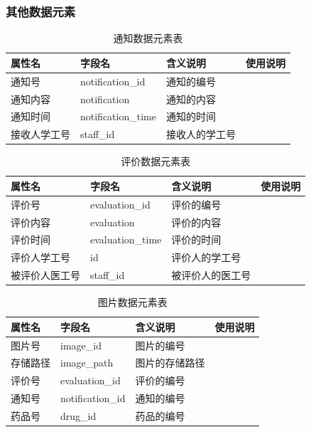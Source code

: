 \documentclass{article}
\begin{document}
\subsubsection{其他数据元素}

\begin{table}[H]
    \centering
    \begin{tabularx}{\textwidth}{|p{2.2cm}|p{3.3cm}|p{4.7cm}|p{5cm}|}
    \toprule
    \textbf{属性名} & \textbf{字段名} & \textbf{含义说明} & \textbf{使用说明} \\ \midrule
    通知号 & notification\_id & 通知的编号 &  \\ \midrule
    通知内容 & notification & 通知的内容 &  \\ \midrule
    通知时间 & notification\_time & 通知的时间 &  \\ \midrule
    接收人学工号 & staff\_id & 接收人的学工号 &  \\ \bottomrule
    \end{tabularx}
    \caption{通知数据元素表}
    \label{tab:notification_elements}
\end{table}

\begin{table}[H]
    \centering
    \begin{tabularx}{\textwidth}{|p{2.2cm}|p{3.3cm}|p{4.7cm}|p{5cm}|}
    \toprule
    \textbf{属性名} & \textbf{字段名} & \textbf{含义说明} & \textbf{使用说明} \\ \midrule
    评价号 & evaluation\_id & 评价的编号 &  \\ \midrule
    评价内容 & evaluation & 评价的内容 &  \\ \midrule
    评价时间 & evaluation\_time & 评价的时间 &  \\ \midrule
    评价人学工号 & id & 评价人的学工号 &  \\ \midrule
    被评价人医工号 & staff\_id & 被评价人的医工号 &  \\ \bottomrule
    \end{tabularx}
    \caption{评价数据元素表}
    \label{tab:evaluation_elements}
\end{table}

\begin{table}[H]
    \centering
    \begin{tabularx}{\textwidth}{|p{2.2cm}|p{3.3cm}|p{4.7cm}|p{5cm}|}
    \toprule
    \textbf{属性名} & \textbf{字段名} & \textbf{含义说明} & \textbf{使用说明} \\ \midrule
    图片号 & image\_id & 图片的编号 &  \\ \midrule
    存储路径 & image\_path & 图片的存储路径 &  \\ \midrule
    评价号 & evaluation\_id & 评价的编号 &  \\ \midrule
    通知号 & notification\_id & 通知的编号 &  \\ \midrule
    药品号 & drug\_id & 药品的编号 &  \\ \bottomrule
    \end{tabularx}
    \caption{图片数据元素表}
    \label{tab:image_elements}
\end{table}
\end{document}
